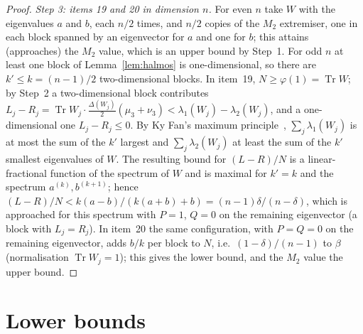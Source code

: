 \documentclass[11pt]{article}
\DeclareMathOperator{\Tr}{Tr}
\theoremstyle{plain}
\theoremstyle{definition}
\theoremstyle{remark}
\begin{document}
\begin{proof}
\emph{Step 3: items 19 and 20 in dimension $n$.} For even $n$ take $W$ with the eigenvalues $a$ and $b$, each $n/2$
times, and $n/2$ copies of the $M_2$ extremiser, one in each block spanned by an eigenvector for $a$ and one for $b$;
this attains (approaches) the $M_2$ value, which is an upper bound by Step~1. For odd $n$ at least one block of
Lemma~\ref{lem:halmos} is one-dimensional, so there are $k'\le k=(n-1)/2$ two-dimensional blocks. In item~19,
$N\ge\varphi(1)=\Tr W$; by Step~2 a two-dimensional block contributes $L_j-R_j=\Tr W_j\cdot\frac{\Delta(W_j)}2(\mu_3+\nu_3)
<\lambda_1(W_j)-\lambda_2(W_j)$, and a one-dimensional one $L_j-R_j\le0$. By Ky Fan's maximum
principle~\cite[Sect.~III.1]{bhatia1997}, $\sum_j\lambda_1(W_j)$ is at most the sum of the $k'$ largest and
$\sum_j\lambda_2(W_j)$ at least the sum of the $k'$ smallest eigenvalues of $W$. The resulting bound for $(L-R)/N$ is a
linear-fractional function of the spectrum of $W$ and is maximal for $k'=k$ and the spectrum $a^{(k)},b^{(k+1)}$; hence
$(L-R)/N<k(a-b)/(k(a+b)+b)=(n-1)\delta/(n-\delta)$, which is approached for this spectrum with $P=1$, $Q=0$ on the remaining
eigenvector (a block with $L_j=R_j$). In item~20 the same configuration, with $P=Q=0$ on the remaining eigenvector, adds $b/k$ per block
to $N$, i.e.\ $(1-\delta)/(n-1)$ to $\beta$ (normalisation $\Tr W_j=1$); this gives the lower bound, and the $M_2$ value
the upper bound.
\end{proof}

\section{Lower bounds}\label{sec:lower}
\end{document}
